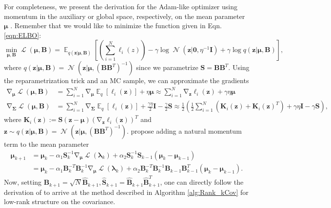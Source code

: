 \documentclass[a4paper, 11pt, oneside]{scrartcl}
\theoremstyle{break}
\DeclareMathOperator{\Normal}{\mathcal{N}}
\DeclareMathOperator{\Expect}{\mathbb{E}}
\DeclareMathOperator{\grad}{\nabla}
\DeclareMathOperator{\ELBO}{\mathcal{L}}
\newcommand{\matr}[1]{\boldsymbol{#1}}
\numberwithin{equation}{section}
\begin{document}
				For completeness, we present the derivation for the Adam-like optimizer using momentum in the auxiliary or global space, respectively, on the mean parameter $\matr{\mu}$ \cite[Sec. E.3]{LSK20}. 
				Remember that we would like to minimize the function given in Eqn. \ref{eqn:ELBO}:
				\begin{equation}
					\min_{\matr{\mu}, \matr{B}} \ELBO(\matr{\mu}, \matr{B}) = \Expect_{q(\matr{z} | \matr{\mu}, \matr{B})} \left[ \left( \sum_{i=1}^N \ell_i(z) \right) - \gamma \log \Normal(\matr{z} | \matr{0}, \eta^{-1} \matr{I}) + \gamma \log q(\matr{z} | \matr{\mu}, \matr{B})\right],
					\label{eqn:ELBO_Objective}
				\end{equation}
				where $q(\matr{z} | \matr{\mu}, \matr{B}) = \Normal(\matr{z} | \matr{\mu}, (\matr{B} \matr{B}^T)^{-1})$ since we parametrize $\matr{S} = \matr{B} \matr{B}^T$.
				Using the reparametrization trick and an MC sample, we can approximate the gradients
				\begin{align*}
					\grad_{\matr{\mu}} \ELBO(\matr{\mu}, \matr{B}) &= \sum_{i=1}^N \grad_{\matr{\mu}}\Expect_q[\ell_i (\matr{z})] + \eta \matr{\mu} \approx \sum_{i=1}^N \grad_{\matr{z}} \ell_i (\matr{z}) + \gamma \eta \matr{\mu} \\
					\grad_{\matr{\Sigma}} \ELBO(\matr{\mu}, \matr{B}) &= \sum_{i=1}^N \grad_{\matr{\Sigma}} \Expect_q[\ell_i (\matr{z})] + \frac{\gamma \eta}{2} \matr{I} - \frac{\gamma}{2} \matr{S} \approx \frac{1}{2} \left( \frac{1}{2} \sum_{i=1}^N (\matr{K}_i(\matr{z}) + \matr{K}_i(\matr{z})^T) + \gamma \eta \matr{I} - \gamma \matr{S} \right),
				\end{align*}
				where $\matr{K}_i(\matr{z}) := \matr{S} (\matr{z} - \matr{\mu}) (\grad_{\matr{z}} \ell_i (\matr{z}) )^T$ and $\matr{z} \sim q(\matr{z} | \matr{\mu}, \matr{B}) = \Normal(\matr{z} | \matr{\mu}, (\matr{B} \matr{B}^T)^{-1})$.
				\cite{KNT+18, LSK20} propose adding a natural momentum term to the mean parameter
				\begin{align*}
					\matr{\mu}_{k+1} &= \matr{\mu}_k - \alpha_1 \matr{S}_k^{-1} \grad_{\matr{\mu}} \ELBO (\matr{\lambda}_k) + \alpha_2 \matr{S}_k^{-1} \matr{S}_{k-1} (\matr{\mu}_k - \matr{\mu}_{k-1}) \\
					&= \matr{\mu}_k - \alpha_1 \matr{B}_k^{-T} \matr{B}_k^{-1} \grad_{\matr{\mu}} \ELBO (\matr{\lambda}_k) + \alpha_2 \matr{B}_k^{-T} \matr{B}_k^{-1} \matr{B}_{k-1} \matr{B}_{k-1}^T (\matr{\mu}_k - \matr{\mu}_{k-1}).
				\end{align*}
				Now, setting $\matr{B}_{k+1} = \sqrt{N} \matr{\hat{B}}_{k+1}, \matr{\hat{S}}_{k+1} = \matr{\hat{B}}_{k+1} \matr{\hat{B}}_{k+1}^T$, one can directly follow the derivation of \cite[Sec. E.3]{LSK20} to arrive at the method described in Algorithm \ref{alg:Rank_kCov} for low-rank structure on the covariance.
\end{document}
